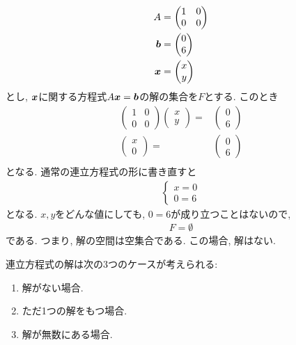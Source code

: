 \begin{example}
  \begin{align*}
    A&=\begin{pmatrix}1&0\\0&0\end{pmatrix}\\
    \boldsymbol{b}&=\begin{pmatrix}0\\6\end{pmatrix}\\
    \boldsymbol{x}&=\begin{pmatrix}x\\y\end{pmatrix}
  \end{align*}
  とし,
  $\boldsymbol{x}$に関する方程式$A\boldsymbol{x}=\boldsymbol{b}$の解の集合を$F$とする.
  このとき
  \begin{align*}
    \begin{pmatrix}1&0\\0&0\end{pmatrix}
      \begin{pmatrix}x\\y\end{pmatrix}=&
        \begin{pmatrix}0\\6\end{pmatrix}\\
          \begin{pmatrix}x\\0\end{pmatrix}=&
            \begin{pmatrix}0\\6\end{pmatrix}\\
  \end{align*}
  となる.
  通常の連立方程式の形に書き直すと
  \begin{align*}
    \begin{cases}
      x=0\\
      0=6
    \end{cases}
  \end{align*}
  となる.
  $x,y$をどんな値にしても, $0=6$が成り立つことはないので,
  \begin{align*}
    F=\emptyset
  \end{align*}
  である. つまり, 解の空間は空集合である.
  この場合, 解はない.
\end{example}

連立方程式の解は次の3つのケースが考えられる:
\begin{enumerate}
  \item 解がない場合.
  \item ただ1つの解をもつ場合.
  \item 解が無数にある場合.
\end{enumerate}

